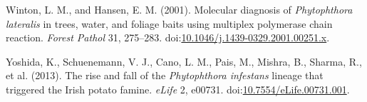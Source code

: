 \documentclass[double,12pt]{beavtex}
\begin{document}
  \hypertarget{ref-winton2001molecular}{}
  Winton, L. M., and Hansen, E. M. (2001). Molecular diagnosis of
  \emph{Phytophthora lateralis} in trees, water, and foliage baits using
  multiplex polymerase chain reaction. \emph{Forest Pathol} 31, 275--283.
  doi:\href{https://doi.org/10.1046/j.1439-0329.2001.00251.x}{10.1046/j.1439-0329.2001.00251.x}.
  
  \hypertarget{ref-yoshida2013rise}{}
  Yoshida, K., Schuenemann, V. J., Cano, L. M., Pais, M., Mishra, B.,
  Sharma, R., et al. (2013). The rise and fall of the \emph{Phytophthora
  infestans} lineage that triggered the Irish potato famine. \emph{eLife}
  2, e00731.
  doi:\href{https://doi.org/10.7554/eLife.00731.001}{10.7554/eLife.00731.001}.
\end{document}
